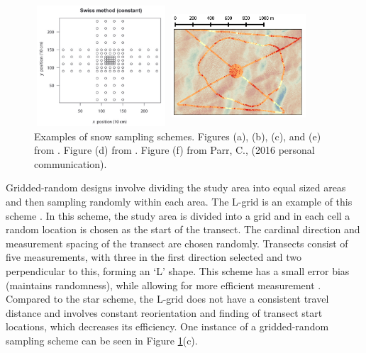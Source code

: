 \documentclass[12pt]{article}
\begin{document}
\begin{figure}
\begin{minipage}[c][11cm][t]{.33\textwidth}
\end{minipage}%
\begin{minipage}[c][11cm][t]{.33\textwidth}
        \vspace*{\fill}
  \centering
    \includegraphics[width=5cm,height=4.5cm]{swiss.png}
   \par\vfill
   \includegraphics[width=5cm,height=4.5cm]{hourglass.png}
\end{minipage}
\caption{Examples of snow sampling schemes. Figures (a), (b), (c), and (e) from \cite{Shea2010}. Figure (d) from \cite{Schweizer2008}. Figure (f) from Parr, C., (2016 personal communication).}
\label{schemes}
\end{figure}

Gridded-random designs involve dividing the study area into equal sized areas and then sampling randomly within each area. The L-grid is an example of this scheme \citep{Bellaire2008, Elder2009, Bellaire2011}. In this scheme, the study area is divided into a grid and in each cell a random location is chosen as the start of the transect. The cardinal direction and measurement spacing of the transect are chosen randomly. Transects consist of five measurements, with three in the first direction selected and two perpendicular to this, forming an `L' shape. This scheme has a small error bias (maintains randomness), while allowing for more efficient measurement \citep{Shea2010}. Compared to the star scheme, the L-grid does not have a consistent travel distance and involves constant reorientation and finding of transect start locations, which decreases its efficiency. One instance of a gridded-random sampling scheme can be seen in Figure \ref{schemes}(c). 
\end{document}
